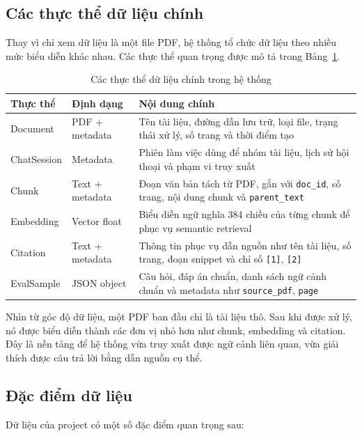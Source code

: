 \documentclass[12pt]{ai_conquer2026}
\begin{document}
\subsection{Các thực thể dữ liệu chính}

Thay vì chỉ xem dữ liệu là một file PDF, hệ thống tổ chức dữ liệu theo nhiều mức biểu diễn khác nhau. Các thực thể quan trọng được mô tả trong Bảng~\ref{tab:data-entities}.

\begin{table}[H]
\centering
\small
\begin{tabular}{|p{2.6cm}|p{2.5cm}|p{8.2cm}|}
\hline
\textbf{Thực thể} & \textbf{Định dạng} & \textbf{Nội dung chính} \\ \hline
Document & PDF + metadata & Tên tài liệu, đường dẫn lưu trữ, loại file, trạng thái xử lý, số trang và thời điểm tạo \\ \hline
ChatSession & Metadata & Phiên làm việc dùng để nhóm tài liệu, lịch sử hội thoại và phạm vi truy xuất \\ \hline
Chunk & Text + metadata & Đoạn văn bản tách từ PDF, gắn với \texttt{doc\_id}, số trang, nội dung chunk và \texttt{parent\_text} \\ \hline
Embedding & Vector float & Biểu diễn ngữ nghĩa 384 chiều của từng chunk để phục vụ semantic retrieval \\ \hline
Citation & Text + metadata & Thông tin phục vụ dẫn nguồn như tên tài liệu, số trang, đoạn snippet và chỉ số \texttt{[1]}, \texttt{[2]} \\ \hline
EvalSample & JSON object & Câu hỏi, đáp án chuẩn, danh sách ngữ cảnh chuẩn và metadata như \texttt{source\_pdf}, \texttt{page} \\ \hline
\end{tabular}
\caption{Các thực thể dữ liệu chính trong hệ thống}
\label{tab:data-entities}
\end{table}

Nhìn từ góc độ dữ liệu, một PDF ban đầu chỉ là tài liệu thô. Sau khi được xử lý, nó được biểu diễn thành các đơn vị nhỏ hơn như chunk, embedding và citation. Đây là nền tảng để hệ thống vừa truy xuất được ngữ cảnh liên quan, vừa giải thích được câu trả lời bằng dẫn nguồn cụ thể.

\subsection{Đặc điểm dữ liệu}

Dữ liệu của project có một số đặc điểm quan trọng sau:
\end{document}
